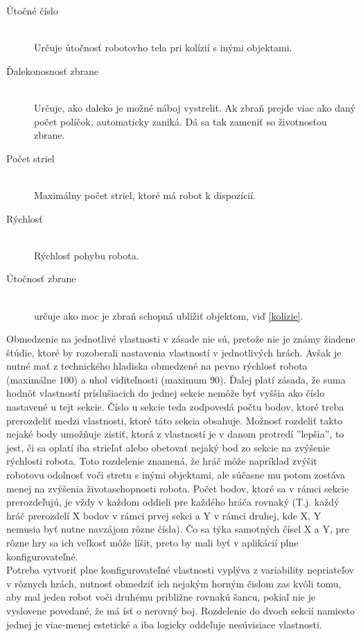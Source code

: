 \begin{description}
\begin{description}
\item [Útočné číslo]\hfill \\ Určuje útočnosť robotovho tela pri kolízií s inými objektami.
\item [Ďalekonosnosť zbrane]\hfill \\ Určuje, ako daleko je možné náboj vystreliť. Ak zbraň prejde viac ako daný počet políčok, automaticky zaniká. Dá sa tak zameniť so životnosťou zbrane.
\item [Počet striel]\hfill \\ Maximálny počet striel, ktoré má robot k dispozícií.
\item [Rýchlosť]\hfill \\ Rýchlosť pohybu robota.
\item [Útočnosť zbrane]\hfill \\ určuje ako moc je zbraň schopná ublížiť objektom, viď \ref{kolizie}.
\end{description}
\end{description}
Obmedzenie na jednotlivé vlastnosti v zásade nie sú, pretože nie je známy žiadene štúdie, ktoré by rozoberali nastavenia vlastností v jednotlivých hrách. Avšak je nutné mať z technického hladiska obmedzené na pevno rýchlosť robota (maximálne 100) a uhol viditeľnosti (maximum 90). Ďalej platí zásada, že suma hodnôt vlastností príslušiacich do jednej sekcie nemôže byť vyššia ako číslo nastavené u tejt sekcie. Číslo u sekcie teda zodpovedá počtu bodov, ktoré treba prerozdeliť medzi vlastnosti, ktoré táto sekcia obsahuje. Možnosť rozdeliť takto nejaké body umožňuje zistiť, ktorá z vlastností je v danom protredí ''lepšia'', to jest, či sa oplatí iba strieľať alebo obetovať nejaký bod zo sekcie na zvýšenie rýchlosti robota.
Toto rozdelenie znamená, že hráč môže napríklad zvýšit robotovu odolnosť voči stretu s inými objektami, ale súčasne mu potom zostáva menej na zvýšenia životaschopnosti robota. Počet bodov, ktoré sa v rámci sekcie prerozdeľujú, je vždy v každom oddieli pre každého hráča rovnaký (T.j. každý hráč prerozdelí X bodov v rámci prvej sekci a  Y v rámci druhej, kde X, Y nemusia byť nutne navzájom rôzne čísla). Čo sa týka samotných čísel X a Y, pre rôzne hry sa ich veľkosť môže líšit, preto by mali byť v aplikácií plne konfigurovateľné.\\
Potreba vytvoriť plne konfigurovateľné vlastnosti vyplýva z variability nepriateľov v rôznych hrách, nutnosť obmedziť ich nejakým horným čislom zas kvôli tomu, aby mal jeden robot voči druhému približne rovnakú šancu, pokiaľ nie je vyslovene povedané, že má ísť o nerovný boj. Rozdelenie do dvoch sekcií namiesto jednej je viac-menej estetické a iba logicky oddeľuje nesúvisiace vlastnosti.
